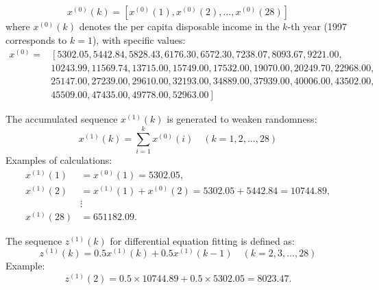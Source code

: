 \documentclass{mcmthesis}
\begin{document}
\begin{equation}
x^{(0)}(k) = \left[ x^{(0)}(1), x^{(0)}(2), \dots, x^{(0)}(28) \right]
\label{eq:original_sequence}
\end{equation}
where \( x^{(0)}(k) \) denotes the per capita disposable income in the \( k \)-th year (1997 corresponds to \( k=1 \)), with specific values:
\begin{equation}
\begin{aligned}
x^{(0)} =& \left[ 5302.05, 5442.84, 5828.43, 6176.30, 6572.30, 7238.07, 8093.67, 9221.00, \right. \\
& 10243.99, 11569.74, 13715.00, 15749.00, 17532.00, 19070.00, 20249.70, 22968.00, \\
& 25147.00, 27239.00, 29610.00, 32193.00, 34889.00, 37939.00, 40006.00, 43502.00, \\
& \left. 45509.00, 47435.00, 49778.00, 52963.00 \right]
\end{aligned}
\label{eq:original_values}
\end{equation}

The accumulated sequence \( x^{(1)}(k) \) is generated to weaken randomness:
\begin{equation}
x^{(1)}(k) = \sum_{i=1}^{k} x^{(0)}(i) \quad (k=1,2,\dots,28)
\label{eq:1-AGO}
\end{equation}
Examples of calculations:
\begin{equation}
\begin{aligned}
x^{(1)}(1) &= x^{(0)}(1) = 5302.05, \\
x^{(1)}(2) &= x^{(1)}(1) + x^{(0)}(2) = 5302.05 + 5442.84 = 10744.89, \\
&\vdots \\
x^{(1)}(28) &= 651182.09.
\end{aligned}
\label{eq:1-AGO_examples}
\end{equation}

The sequence \( z^{(1)}(k) \) for differential equation fitting is defined as:
\begin{equation}
z^{(1)}(k) = 0.5x^{(1)}(k) + 0.5x^{(1)}(k-1) \quad (k=2,3,\dots,28)
\label{eq:neighbor_mean}
\end{equation}
Example:
\begin{equation}
z^{(1)}(2) = 0.5 \times 10744.89 + 0.5 \times 5302.05 = 8023.47.
\label{eq:neighbor_mean_example}
\end{equation}
\end{document}
